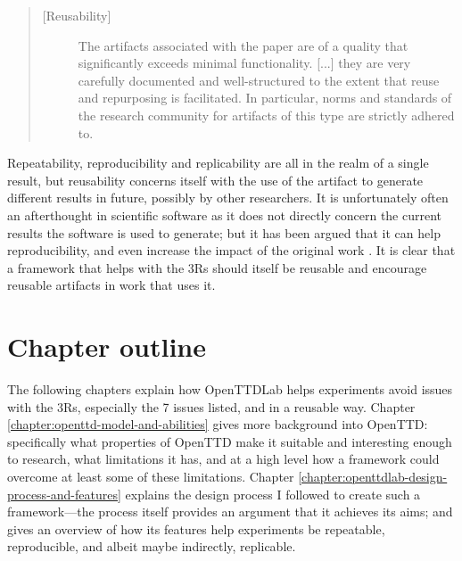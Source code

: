 \documentclass[logo,msc,dsti]{style/infthesis}    %
\begin{document}
{\begin{quote}
\begin{description}
\item[{[}Reusability{]}] 
The artifacts associated with the paper are of a quality that significantly exceeds minimal functionality. [...] they are very carefully documented and well-structured to the extent that reuse and repurposing is facilitated. In particular, norms and standards of the research community for artifacts of this type are strictly adhered to. 
\end{description}
\end{quote}
Repeatability, reproducibility and replicability are all in the realm of a single result, but reusability concerns itself with the use of the artifact to generate different results in future, possibly by other researchers. It is unfortunately often an afterthought in scientific software as it does not directly concern the current results the software is used to generate; but it has been argued that it can help reproducibility, and even increase the impact of the original work \cite{benureau2018re}. It is clear that a framework that helps with the 3Rs should itself be reusable and encourage reusable artifacts in work that uses it.

\section{Chapter outline}

The following chapters explain how OpenTTDLab helps experiments avoid issues with the 3Rs, especially the 7 issues listed, and in a reusable way. Chapter \ref{chapter:openttd-model-and-abilities} gives more background into OpenTTD: specifically what properties of OpenTTD make it suitable and interesting enough to research, what limitations it has, and at a high level how a framework could overcome at least some of these limitations. Chapter \ref{chapter:openttdlab-design-process-and-features} explains the design process I followed to create such a framework---the process itself provides an argument that it achieves its aims; and gives an overview of how its features help experiments be repeatable, reproducible, and albeit maybe indirectly, replicable. 

}
\end{document}

